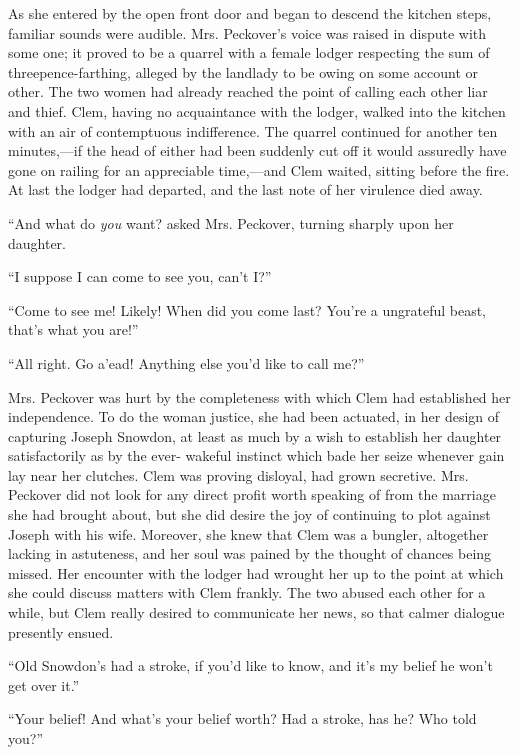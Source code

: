 As she entered by the open front door and began to descend the kitchen
steps, familiar sounds were audible. Mrs. Peckover's voice was raised in
dispute with some one; it proved to be a quarrel with a female lodger
respecting {\protect\hypertarget{165}{}{}}the sum of
threepence-farthing, alleged by the landlady to be owing on some account
or other. The two women had already reached the point of calling each
other liar and thief. Clem, having no acquaintance with the lodger,
walked into the kitchen with an air of contemptuous indifference. The
quarrel continued for another ten minutes,---if the head of either had
been suddenly cut off it would assuredly have gone on railing for an
appreciable time,---and Clem waited, sitting before the fire. At last
the lodger had departed, and the last note of her virulence died away.

``And what do \emph{you} want? asked Mrs. Peckover, turning sharply upon
her daughter.

``I suppose I can come to see you, can't I?''

``Come to see me! Likely! When did you come last? You're a ungrateful
beast, that's what you are!''

``All right. Go a'ead! Anything else you'd like to call me?''

Mrs. Peckover was hurt by the completeness with which Clem had
established her independence. To do the woman justice, she had been
actuated, in her design of capturing Joseph Snowdon, at least as much by
a wish {\protect\hypertarget{166}{}{}}to establish her daughter
satisfactorily as by the ever- wakeful instinct which bade her seize
whenever gain lay near her clutches. Clem was proving disloyal, had
grown secretive. Mrs. Peckover did not look for any direct profit worth
speaking of from the marriage she had brought about, but she did desire
the joy of continuing to plot against Joseph with his wife. Moreover,
she knew that Clem was a bungler, altogether lacking in astuteness, and
her soul was pained by the thought of chances being missed. Her
encounter with the lodger had wrought her up to the point at which she
could discuss matters with Clem frankly. The two abused each other for a
while, but Clem really desired to communicate her news, so that calmer
dialogue presently ensued.

``Old Snowdon's had a stroke, if you'd like to know, and it's my belief
he won't get over it.''

``Your belief! And what's your belief worth? Had a stroke, has he? Who
told you?''

